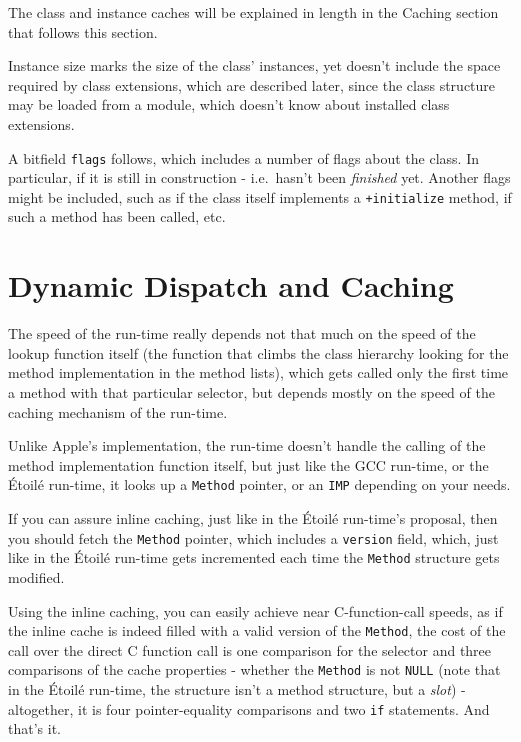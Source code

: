 The class and instance caches will be explained in length in the Caching section that follows this section.

Instance size marks the size of the class' instances, yet doesn't include the space required by class extensions, which are described later, since the class structure may be loaded from a module, which doesn't know about installed class extensions.

A bitfield \verb=flags= follows, which includes a number of flags about the class. In particular, if it is still in construction - i.e.\ hasn't been \emph{finished} yet. Another flags might be included, such as if the class itself implements a \verb=+initialize= method, if such a method has been called, etc.

\section{Dynamic Dispatch and Caching}

The speed of the run-time really depends not that much on the speed of the lookup function itself (the function that climbs the class hierarchy looking for the method implementation in the method lists), which gets called only the first time a method with that particular selector, but depends mostly on the speed of the caching mechanism of the run-time.

Unlike Apple's implementation, the run-time doesn't handle the calling of the method implementation function itself, but just like the GCC run-time, or the \'Etoil\'e run-time, it looks up a \verb=Method= pointer, or an \verb=IMP= depending on your needs.

If you can assure inline caching, just like in the \'Etoil\'e run-time's proposal, then you should fetch the \verb=Method= pointer, which includes a \verb=version= field, which, just like in the \'Etoil\'e run-time gets incremented each time the \verb=Method= structure gets modified.

Using the inline caching, you can easily achieve near C-function-call speeds, as if the inline cache is indeed filled with a valid version of the \verb=Method=, the cost of the call over the direct C function call is one comparison for the selector and three comparisons of the cache properties - whether the \verb=Method= is not \verb=NULL= (note that in the \'Etoil\'e run-time, the structure isn't a method structure, but a \emph{slot}) - altogether, it is four pointer-equality comparisons and two \verb=if= statements. And that's it.

